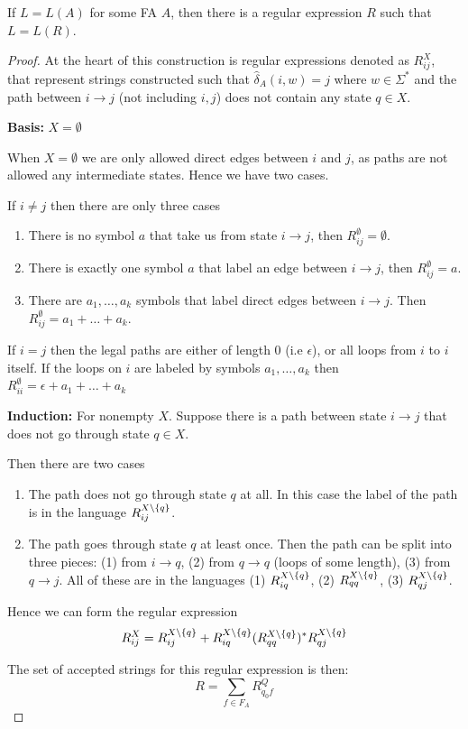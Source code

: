 \begin{theorem}
    If $L = L(A)$ for some FA $A$, then there is a regular expression $R$ such that $L = L(R)$.
\end{theorem}

\begin{proof}
    At the heart of this construction is regular expressions denoted as $R^X_{ij}$, that represent strings constructed such that $\hat\delta_A(i, w) = j$ where $w \in \Sigma^*$ and the path between $i \rightarrow j$ (not including $i,j$) does not contain any state $q\in X$.

    \textbf{Basis:} $X = \emptyset$

    When $X = \emptyset$ we are only allowed direct edges between $i$ and $j$, as paths are not allowed any intermediate states. Hence we have two cases. 

    If $i \neq j$ then there are only three cases 
    \begin{enumerate}
        \item There is no symbol $a$ that take us from state $i \rightarrow j$, then $R^\emptyset_{ij} = \emptyset$.
        \item There is exactly one symbol $a$ that label an edge between $i \rightarrow j$, then $R^\emptyset_{ij} = a$.
        \item There are $a_1, \dots, a_k$ symbols that label direct edges between $i \rightarrow j$. Then $R^\emptyset_{ij} = a_1 + \dots + a_k$.
    \end{enumerate}

    If $i = j$ then the legal paths are either of length $0$ (i.e $\epsilon$), or all loops from $i$ to $i$ itself. If the loops on $i$ are labeled by symbols $a_1, \dots, a_k$ then $R^\emptyset_{ii} = \epsilon + a_1 + \dots + a_k$

    \textbf{Induction:} For nonempty $X$. Suppose there is a path between state $i \rightarrow j$ that does not go through state $q \in X$.

    Then there are two cases 
    \begin{enumerate}
        \item The path does not go through state $q$ at all. In this case the label of the path is in the language $R^{X\setminus\left\{ q \right\}}_{ij}$.
        \item The path goes through state $q$ at least once. Then the path can be split into three pieces: (1) from $i \rightarrow q$, (2) from $q \rightarrow q$ (loops of some length), (3) from $q \rightarrow j$. All of these are in the languages (1) $R^{X\setminus\left\{ q \right\}}_{iq}$, (2) $R^{X\setminus\left\{ q \right\}}_{qq}$, (3) $R^{X\setminus\left\{ q \right\}}_{qj}$.
    \end{enumerate}

    Hence we can form the regular expression 
    $$R^{X}_{ij} = R^{X\setminus\left\{ q \right\}}_{ij} + R^{X\setminus\left\{ q \right\}}_{iq} (R^{X\setminus\left\{ q \right\}}_{qq})^* R^{X\setminus\left\{ q \right\}}_{qj}$$

    The set of accepted strings for this regular expression is then: 
    $$R = \sum_{f \in F_A} R^{Q}_{q_0f}$$
\end{proof}

